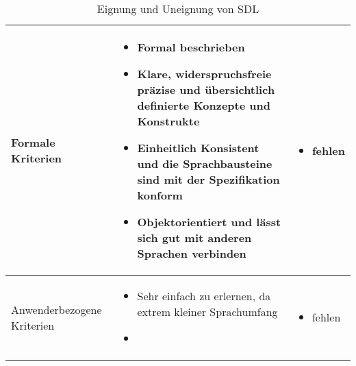 \begin{table}[ht]
	\begin{tabularx}{\textwidth}{|l|X|X|}
		\hline
		Formale	Kriterien &
		\begin{itemize}
			\item Formal beschrieben
			\item Klare, widerspruchsfreie präzise und übersichtlich definierte Konzepte und Konstrukte
			\item Einheitlich Konsistent und die Sprachbausteine sind mit der Spezifikation konform
			\item Objektorientiert und lässt sich gut mit anderen Sprachen verbinden
		\end{itemize}  & 
		\begin{itemize}
			\item fehlen
		\end{itemize} \\
	\hline
	Anwenderbezogene Kriterien &
	\begin{itemize}
		\item Sehr einfach zu erlernen, da extrem kleiner Sprachumfang
		\item 
	\end{itemize}  & 
	\begin{itemize}
		\item fehlen
	\end{itemize} \\
		\hline
	\end{tabularx} 
	\caption{Eignung und Uneignung von SDL}
	\label{tab:EignungSDL}
\end{table} 
